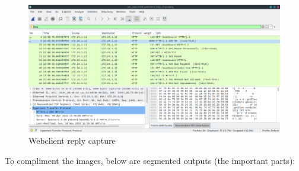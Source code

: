 \documentclass[11pt,a4paper]{report}
\begin{document}
\begin{flushleft}
\begin{flushleft}
                \begin{figure}
                    \centering
                    \includegraphics[scale=0.43]{wscapwcsocket06} %
                    \caption{Webclient reply capture} \label{fig:wireshark2}
                \end{figure}
            \end{flushleft}
            
            \clearpage
            To compliment the images, below are segmented outputs (the important parts):
        \end{flushleft}
\end{document}

